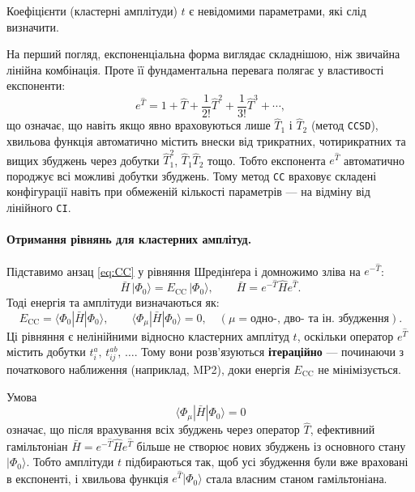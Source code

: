 Коефіцієнти (кластерні амплітуди) $t$ є невідомими параметрами, які слід визначити.

\begin{commentbox}
На перший погляд, експоненціальна форма виглядає складнішою, ніж
звичайна лінійна комбінація. Проте її фундаментальна перевага полягає
у властивості експоненти:
\begin{equation}
    e^{\hat{T}} = 1 + \hat{T} + \frac{1}{2!}\hat{T}^2 +
    \frac{1}{3!}\hat{T}^3 + \cdots,
\end{equation}
що означає, що навіть якщо явно враховуються лише \(\hat{T}_1\) і \(\hat{T}_2\)
(метод \texttt{CCSD}), хвильова функція автоматично містить внески від
трикратних, чотирикратних та вищих збуджень через добутки
\(\hat{T}_1^2\), \(\hat{T}_1\hat{T}_2\) тощо. Тобто експонента  $e^{\hat{T}}$ автоматично породжує всі можливі добутки збуджень. Тому метод \texttt{CC} враховує складені конфігурації навіть при обмеженій кількості параметрів ---
на відміну від лінійного \texttt{CI}.
\end{commentbox}

\paragraph{Отримання рівнянь для кластерних амплітуд.}
Підставимо анзац \eqref{eq:CC} у рівняння Шредінґера і домножимо зліва на $e^{-\hat{T}}$:
\[
\bar{H}\,|\Phi_0\rangle = E_{\text{CC}}\,|\Phi_0\rangle, \qquad
\bar{H} = e^{-\hat{T}}\hat{H}e^{\hat{T}}.
\]
Тоді енергія та амплітуди визначаються як:
\[
E_{\text{CC}} = \langle \Phi_0 | \bar{H} | \Phi_0 \rangle, \qquad
\langle \Phi_\mu | \bar{H} | \Phi_0 \rangle = 0, \quad
(\mu = \text{одно-, дво- та ін. збудження}).
\]
Ці рівняння є нелінійними відносно кластерних амплітуд \(t\),
оскільки оператор $e^{\hat{T}}$ містить добутки $t_i^a,\,t_{ij}^{ab},\,\ldots$.
Тому вони розв’язуються \textbf{ітераційно} --- починаючи з початкового наближення (наприклад, MP2),
доки енергія $E_{\text{CC}}$ не мінімізується.

\begin{commentbox}
Умова
\[
\langle \Phi_\mu | \bar{H} | \Phi_0 \rangle = 0
\]
означає, що після врахування всіх збуджень через оператор \(\hat{T}\),
ефективний гамільтоніан
\(\bar{H} = e^{-\hat{T}}\hat{H}e^{\hat{T}}\)
більше не створює нових збуджень із основного стану \(|\Phi_0\rangle\).
Тобто амплітуди \(t\) підбираються так, щоб усі збудження були вже враховані
в експоненті, і хвильова функція \(e^{\hat{T}}|\Phi_0\rangle\) стала власним
станом гамільтоніана.
\end{commentbox}

